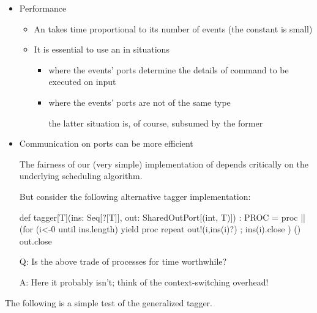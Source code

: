 \documentclass{concdistfoils}
\begin{document}
\begin{slide}
\begin{itemize}
\item Performance
\begin{itemize}
\item An  takes time proportional to its number of events (the constant is small)
\item It is essential to use an  in situations 
\begin{itemize}
\item where the events' ports determine the details of command to be executed on input 
\item where the events' ports are not of the same type 
\begin{note}
the latter situation is, of course, subsumed by the former
\end{note}
\end{itemize}
\end{itemize}
\vfill
\item Communication on  ports can be more efficient
\begin{note}
The fairness of our (very simple) implementation of  depends critically
on the underlying scheduling algorithm. 
\end{note}
\item[]But consider the following alternative tagger implementation:
\begin{hideobj}{csoexamples/AltMultiTagger}
package csoexamples

object AltMultiTagger
{ import ox.CSO._
  
\end{hideobj}
\begin{obj}{}
  def tagger[T](ins: Seq[?[T]], out: SharedOutPort[(int, T)]) : PROC = proc
  { || (for (i<-0 until ins.length) yield 
             proc { repeat { out!(i,ins(i)?) }; ins(i).close }) ()    
    out.close  
  }
\end{obj}
\item[Q:] Is the above trade of processes for  time worthwhile?
\item[A:] Here it probably isn't; think of the context-switching overhead!
\end{itemize}
\begin{note} 
The following is a simple test of the generalized tagger.


\end{note}
\end{slide}
\end{document}
